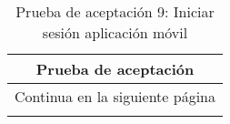 \begin{longtable}{|p{6.7cm}|p{6.7cm}|}
    \caption{Prueba de aceptación 9: Iniciar sesión aplicación móvil} \label{tab:prueba-9}
    \\
    \hline
    \multicolumn{2}{|c|}{\textbf{Prueba de aceptación}}                                                                                                                                                                                                                                                                                               \\
    \hline

    \endfirsthead

    \hline
    \endhead

    \hline
    \multicolumn{2}{|c|}{{Continua en la siguiente página}}                                                                                                                                                                                                                                                                                           \\
    \hline
    \endfoot


\end{longtable}
